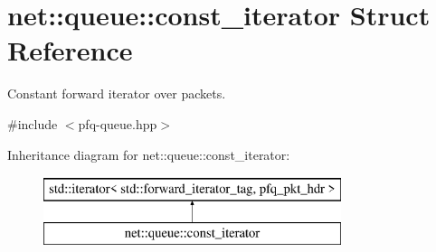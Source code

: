 \hypertarget{structnet_1_1queue_1_1const__iterator}{\section{net\+:\+:queue\+:\+:const\+\_\+iterator Struct Reference}
\label{structnet_1_1queue_1_1const__iterator}
}


Constant forward iterator over packets.  




{\ttfamily \#include $<$pfq-\/queue.\+hpp$>$}

Inheritance diagram for net\+:\+:queue\+:\+:const\+\_\+iterator\+:\begin{figure}[H]
\begin{center}
\leavevmode
\includegraphics[height=2.000000cm]{structnet_1_1queue_1_1const__iterator}
\end{center}
\end{figure}
